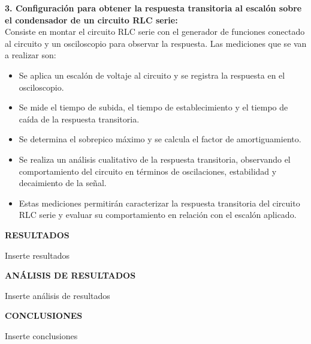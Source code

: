 \documentclass[12pt]{article}
\begin{document}
    \textbf{3. Configuración para obtener la respuesta transitoria al escalón sobre el condensador de un circuito RLC serie:}\\
    
    Consiste en montar el circuito RLC serie con el generador de funciones conectado al circuito y un osciloscopio para observar la respuesta. Las mediciones que se van a realizar son:

    \begin{itemize}
        \item Se aplica un escalón de voltaje al circuito y se registra la respuesta en el osciloscopio.
        \item Se mide el tiempo de subida, el tiempo de establecimiento y el tiempo de caída de la respuesta transitoria.
        \item Se determina el sobrepico máximo y se calcula el factor de amortiguamiento.
        \item Se realiza un análisis cualitativo de la respuesta transitoria, observando el comportamiento del circuito en términos de oscilaciones, estabilidad y decaimiento de la señal.
        \item Estas mediciones permitirán caracterizar la respuesta transitoria del circuito RLC serie y evaluar su comportamiento en relación con el escalón aplicado.
    \end{itemize}
    
    \newpage
    
    \begin{center}
        \textbf{\large RESULTADOS}\\
    \end{center}
    
    Inserte resultados
    
    \newpage
    
    \begin{center}
        \textbf{\large ANÁLISIS DE RESULTADOS}\\
    \end{center}
    
    Inserte análisis de resultados
    
    \newpage
    
    \begin{center}
        \textbf{\large CONCLUSIONES}\\
    \end{center}
    
    Inserte conclusiones
    
    \newpage
    
\end{document}
